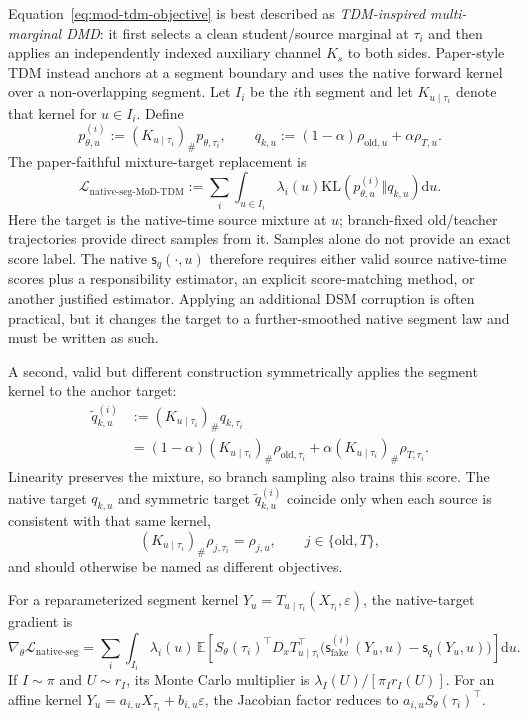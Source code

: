 \documentclass[11pt,a4paper]{article}
\newcommand{\E}{\mathbb{E}}
\newcommand{\KL}{\mathrm{KL}}
\newcommand{\dd}{\mathrm{d}}
\newcommand{\old}{\mathrm{old}}
\newcommand{\fake}{\mathrm{fake}}
\newcommand{\score}{\mathsf{s}}
\theoremstyle{plain}
\theoremstyle{definition}
\begin{document}
Equation~\eqref{eq:mod-tdm-objective} is best described as
\emph{TDM-inspired multi-marginal DMD}: it first selects a clean student/source marginal at
$\tau_i$ and then applies an independently indexed auxiliary channel $K_s$ to both sides.
Paper-style TDM instead anchors at a segment boundary and uses the native forward kernel over a
non-overlapping segment.  Let $I_i$ be the $i$th segment and let
$K_{u\mid\tau_i}$ denote that kernel for $u\in I_i$.  Define
\begin{equation}
p_{\theta,u}^{(i)}
:=(K_{u\mid\tau_i})_\#p_{\theta,\tau_i},
\qquad
q_{k,u}:=(1-\alpha)\rho_{\old,u}+\alpha\rho_{T,u}.
\label{eq:native-segment-target}
\end{equation}
The paper-faithful mixture-target replacement is
\begin{equation}
\boxed{
\mathcal L_{\mathrm{native\text{-}seg\text{-}MoD\text{-}TDM}}
:=\sum_i\int_{u\in I_i}\lambda_i(u)
\KL\!\left(p_{\theta,u}^{(i)}\Vert q_{k,u}\right)\dd u.
}
\label{eq:segment-mod-tdm}
\end{equation}
Here the target is the native-time source mixture at $u$; branch-fixed old/teacher trajectories
provide direct samples from it.  Samples alone do not provide an exact score label.  The native
$\score_q(\cdot,u)$ therefore requires either valid source native-time scores plus a responsibility
estimator, an explicit score-matching method, or another justified estimator.  Applying an
additional DSM corruption is often practical, but it changes the target to a further-smoothed
native segment law and must be written as such.

A second, valid but different construction symmetrically applies the segment kernel to the
anchor target:
\begin{align}
\widetilde q_{k,u}^{(i)}
&:=(K_{u\mid\tau_i})_\#q_{k,\tau_i}\nonumber\\
&=(1-\alpha)(K_{u\mid\tau_i})_\#\rho_{\old,\tau_i}
  +\alpha(K_{u\mid\tau_i})_\#\rho_{T,\tau_i}.
\label{eq:symmetric-segment-mixture}
\end{align}
Linearity preserves the mixture, so branch sampling also trains this score.  The native target
$q_{k,u}$ and symmetric target $\widetilde q_{k,u}^{(i)}$ coincide only when each source is
consistent with that same kernel,
\[
(K_{u\mid\tau_i})_\#\rho_{j,\tau_i}=\rho_{j,u},
\qquad j\in\{\old,T\},
\]
and should otherwise be named as different objectives.

For a reparameterized segment kernel
$Y_u=T_{u\mid\tau_i}(X_{\tau_i},\varepsilon)$, the native-target gradient is
\begin{equation}
\nabla_\theta\mathcal L_{\mathrm{native\text{-}seg}}
=\sum_i\int_{I_i}\lambda_i(u)\,
\E\!\left[
S_\theta(\tau_i)^\top D_xT_{u\mid\tau_i}^{\top}
\bigl(\score_{\fake}^{(i)}(Y_u,u)-\score_q(Y_u,u)\bigr)
\right]\dd u.
\label{eq:segment-gradient}
\end{equation}
If $I\sim\pi$ and $U\sim r_I$, its Monte Carlo multiplier is
$\lambda_I(U)/[\pi_Ir_I(U)]$.  For an affine kernel
$Y_u=a_{i,u}X_{\tau_i}+b_{i,u}\varepsilon$, the Jacobian factor reduces to
$a_{i,u}S_\theta(\tau_i)^\top$.
\end{document}
